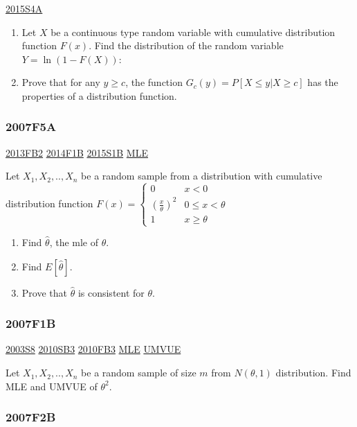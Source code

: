 \documentclass[10pt,twocolumn,portrait]{article}
\begin{document}
\protect\hyperlink{s4a-1}{2015S4A}

\begin{enumerate}
\def\labelenumi{(\alph{enumi})}
\item
  Let \(X\) be a continuous type random variable with cumulative
  distribution function \(F(x)\). Find the distribution of the random
  variable \(Y=\ln(1-F(X))\):
\item
  Prove that for any \(y\ge c\), the function
  \(G_c(y)=P[X\le y|X\ge c]\) has the properties of a distribution
  function.
\end{enumerate}

\hypertarget{f5a}{%
\subsubsection{2007F5A}\label{f5a}}

\protect\hyperlink{fb2-2}{2013FB2} \protect\hyperlink{f1b-1}{2014F1B}
\protect\hyperlink{s1b-1}{2015S1B} \protect\hyperlink{MLE}{MLE}

Let \(X_1,X_2,..,X_n\) be a random sample from a distribution with
cumulative distribution function
\(F(x)=\begin{cases}0&x<0\\(\frac{x}\theta)^2& 0\le x<\theta\\1& x\ge\theta\end{cases}\)

\begin{enumerate}
\def\labelenumi{(\alph{enumi})}
\item
  Find \(\hat\theta\), the mle of \(\theta\).
\item
  Find \(E[\hat\theta]\).
\item
  Prove that \(\hat\theta\) is consistent for \(\theta\).
\end{enumerate}

\hypertarget{f1b}{%
\subsubsection{2007F1B}\label{f1b}}

\protect\hyperlink{s8}{2003S8} \protect\hyperlink{sb3-1}{2010SB3}
\protect\hyperlink{fb3-1}{2010FB3} \protect\hyperlink{MLE}{MLE}
\protect\hyperlink{section-5}{UMVUE}

Let \(X_1,X_2,..,X_n\) be a random sample of size \(m\) from
\(N(\theta,1)\) distribution. Find MLE and UMVUE of \(\theta^2\).

\hypertarget{f2b}{%
\subsubsection{2007F2B}\label{f2b}}
\end{document}
